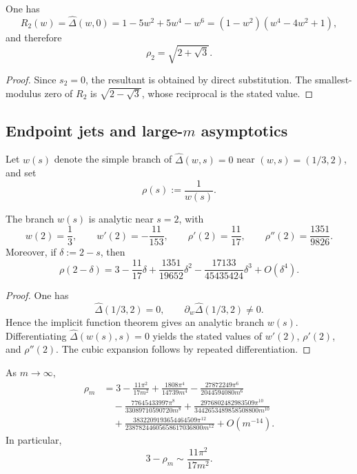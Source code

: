 \begin{corollary}[The twist \(m=2\)]
  \label{cor:rho-m2-closed-form}
  One has
  \[
    R_2(w)=\widehat\Delta(w,0)
    =1-5w^2+5w^4-w^6
    =(1-w^2)(w^4-4w^2+1),
  \]
  and therefore
  \[
    \rho_2=\sqrt{2+\sqrt3}.
  \]
\end{corollary}

\begin{proof}
Since \(s_2=0\), the resultant is obtained by direct substitution. The
smallest-modulus zero of \(R_2\) is \(\sqrt{2-\sqrt3}\), whose
reciprocal is the stated value.
\end{proof}

\subsection{Endpoint jets and large-\texorpdfstring{$m$}{m} asymptotics}

Let \(w(s)\) denote the simple branch of \(\widehat\Delta(w,s)=0\) near
\((w,s)=(1/3,2)\), and set
\[
  \rho(s):=\frac{1}{w(s)}.
\]

\begin{proposition}
  \label{prop:sync-endpoint-jet}
  The branch \(w(s)\) is analytic near \(s=2\), with
  \[
    w(2)=\frac13,\qquad
    w'(2)=-\frac{11}{153},\qquad
    \rho'(2)=\frac{11}{17},\qquad
    \rho''(2)=\frac{1351}{9826}.
  \]
  Moreover, if \(\delta:=2-s\), then
  \[
    \rho(2-\delta)
    =3-\frac{11}{17}\delta+\frac{1351}{19652}\delta^2
      -\frac{17133}{45435424}\delta^3+O(\delta^4).
  \]
\end{proposition}

\begin{proof}
One has
\[
  \widehat\Delta(1/3,2)=0,\qquad
  \partial_w\widehat\Delta(1/3,2)\neq 0.
\]
Hence the implicit function theorem gives an analytic branch \(w(s)\).
Differentiating \(\widehat\Delta(w(s),s)=0\) yields the stated values of
\(w'(2)\), \(\rho'(2)\), and \(\rho''(2)\). The cubic expansion follows
by repeated differentiation.
\end{proof}

\begin{theorem}
  \label{thm:rho-gap-m12}
  As \(m\to\infty\),
  \begin{align*}
    \rho_m
    &=3-\frac{11\pi^2}{17m^2}
      +\frac{1808\pi^4}{14739m^4}
      -\frac{27872249\pi^6}{2044594080m^6} \\
    &\quad
      -\frac{77645433997\pi^8}{33089710590720m^8}
      +\frac{2976802482983509\pi^{10}}
             {3442653489858508800m^{10}} \\
    &\quad
      +\frac{3832209193654464509\pi^{12}}
             {23878244605658617036800m^{12}}
      +O(m^{-14}).
  \end{align*}
  In particular,
  \[
    3-\rho_m\sim \frac{11\pi^2}{17m^2}.
  \]
\end{theorem}

